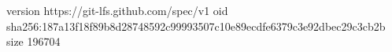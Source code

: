 version https://git-lfs.github.com/spec/v1
oid sha256:187a13f18f89b8d28748592c99993507c10e89ecdfe6379c3e92dbec29c3cb2b
size 196704
